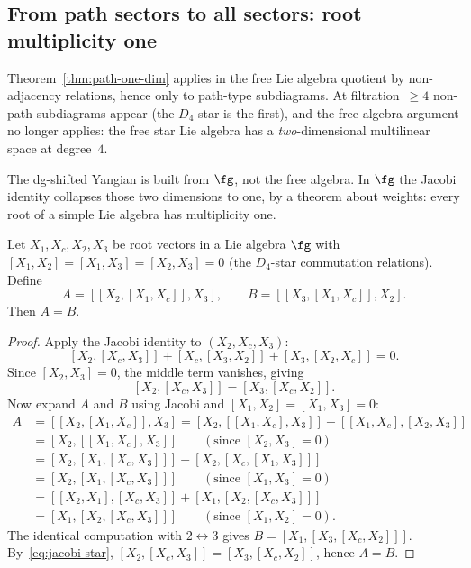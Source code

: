 \subsection{From path sectors to all sectors: root multiplicity one}

Theorem~\ref{thm:path-one-dim} applies in the free Lie algebra
quotient by non-adjacency relations, hence only to path-type
subdiagrams. At filtration~$\ge 4$ non-path subdiagrams appear (the
$D_4$ star is the first), and the free-algebra argument no longer
applies: the free star Lie algebra has a \emph{two}-dimensional
multilinear space at degree~$4$.

The dg-shifted Yangian is built from $\fg$, not the free algebra. In
$\fg$ the Jacobi identity collapses those two dimensions to one, by
a theorem about weights: every root of a simple Lie algebra has
multiplicity one.

\begin{lemma}
\label{lem:jacobi-collapse}
Let $X_1,X_c,X_2,X_3$ be root vectors in a Lie algebra $\fg$ with
$[X_1,X_2]=[X_1,X_3]=[X_2,X_3]=0$ (the $D_4$-star commutation
relations). Define
\[
A = [[X_2,[X_1,X_c]],X_3],
\qquad
B = [[X_3,[X_1,X_c]],X_2].
\]
Then $A=B$.
\end{lemma}

\begin{proof}
Apply the Jacobi identity to $(X_2,X_c,X_3)$:
\[
[X_2,[X_c,X_3]]+[X_c,[X_3,X_2]]+[X_3,[X_2,X_c]]=0.
\]
Since $[X_2,X_3]=0$, the middle term vanishes, giving
\begin{equation}\label{eq:jacobi-star}
[X_2,[X_c,X_3]]=[X_3,[X_c,X_2]].
\end{equation}
Now expand $A$ and $B$ using Jacobi and $[X_1,X_2]=[X_1,X_3]=0$:
\begin{align*}
A &= [[X_2,[X_1,X_c]],X_3]
 = [X_2,[[X_1,X_c],X_3]] - [[X_1,X_c],[X_2,X_3]]\\
 &= [X_2,[[X_1,X_c],X_3]]
 \qquad(\text{since }[X_2,X_3]=0)\\
 &= [X_2,[X_1,[X_c,X_3]]] - [X_2,[X_c,[X_1,X_3]]]\\
 &= [X_2,[X_1,[X_c,X_3]]]
 \qquad(\text{since }[X_1,X_3]=0)\\
 &= [[X_2,X_1],[X_c,X_3]] + [X_1,[X_2,[X_c,X_3]]]\\
 &= [X_1,[X_2,[X_c,X_3]]]
 \qquad(\text{since }[X_1,X_2]=0).
\end{align*}
The identical computation with $2\leftrightarrow 3$ gives
$B=[X_1,[X_3,[X_c,X_2]]]$. By~\eqref{eq:jacobi-star},
$[X_2,[X_c,X_3]]=[X_3,[X_c,X_2]]$, hence $A=B$.
\end{proof}


